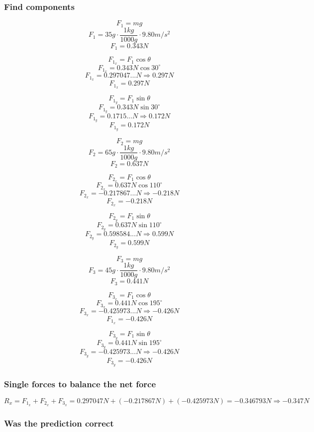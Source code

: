 \documentclass[11pt, letterpaper, includehead]{article}
\begin{document}
\subsubsection{Find components} %
\begin{multicols}{3}
  $$F_1 = mg$$
  $$F_1 = 35g \cdot \frac{1kg}{1000g} \cdot 9.80m/s^2$$
  $$F_1 = 0.343N$$

  $$F_{1_x} = F_1\cos\theta$$
  $$F_{1_x} = 0.343N\cos30^{\circ}$$
  $$F_{1_x} = 0.297047...N \Rightarrow 0.297N$$
  $$\boxed{F_{1_x} = 0.297N}$$

  $$F_{1_y} = F_1\sin\theta$$
  $$F_{1_y} = 0.343N\sin30^{\circ}$$
  $$F_{1_y} = 0.1715...N \Rightarrow 0.172N$$
  $$\boxed{F_{1_y} = 0.172N}$$

  \columnbreak
  $$F_2 = mg$$
  $$F_2 = 65g \cdot \frac{1kg}{1000g} \cdot 9.80m/s^2$$
  $$F_2 = 0.637N$$

  $$F_{2_x} = F_1\cos\theta$$
  $$F_{2_x} = 0.637N\cos110^{\circ}$$
  $$F_{2_x} = -0.217867...N \Rightarrow -0.218N$$
  $$\boxed{F_{2_x} = -0.218N}$$

  $$F_{2_y} = F_1\sin\theta$$
  $$F_{2_y} = 0.637N\sin110^{\circ}$$
  $$F_{2_y} = 0.598584...N \Rightarrow 0.599N$$
  $$\boxed{F_{2_y} = 0.599N}$$

  \columnbreak
  $$F_3 = mg$$
  $$F_3 = 45g \cdot \frac{1kg}{1000g} \cdot 9.80m/s^2$$
  $$F_3 = 0.441N$$

  $$F_{3_x} = F_1\cos\theta$$
  $$F_{3_x} = 0.441N\cos195^{\circ}$$
  $$F_{3_x} = -0.425973...N \Rightarrow -0.426N$$
  $$\boxed{F_{1_x} = -0.426N}$$

  $$F_{3_y} = F_1\sin\theta$$
  $$F_{3_y} = 0.441N\sin195^{\circ}$$
  $$F_{3_y} = -0.425973...N \Rightarrow -0.426N$$
  $$\boxed{F_{3_y} = -0.426N}$$
 
\end{multicols}

\subsubsection{Single forces to balance the net force} %
$$R_x = F_{1_x} + F_{2_x} + F_{3_x} = 0.297047N + (-0.217867N) + (-0.425973N) = -0.346793N \Rightarrow \boxed{-0.347N} $$

\subsubsection{Was the prediction correct} %
\end{document}
